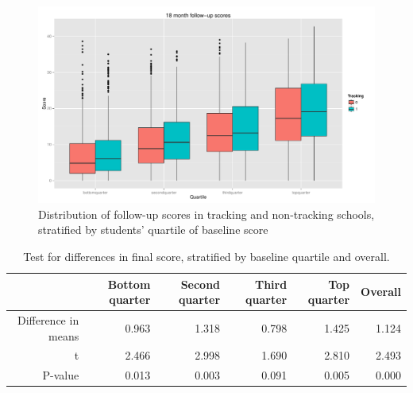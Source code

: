 \documentclass[11pt]{article}
\begin{document}
  \begin{figure}[H]
 \centering
 \includegraphics[scale=0.5]{tracking-stratif.pdf}
 \caption{Distribution of follow-up scores in tracking and non-tracking schools, stratified by students' quartile of baseline score}
 \label{fig:tracking-stratif}
 \end{figure} 
\begin{table}[ht]
\centering
\begin{tabular}{rrrrrr}
  \hline
 & Bottom quarter & Second quarter & Third quarter & Top quarter & Overall \\ 
  \hline
Difference in means & 0.963 & 1.318 & 0.798 & 1.425 & 1.124 \\ 
  t & 2.466 & 2.998 & 1.690 & 2.810 & 2.493 \\ 
  P-value & 0.013 & 0.003 & 0.091 & 0.005 & 0.000 \\ 
   \hline
\end{tabular}
\caption{Test for differences in final score, stratified by baseline quartile and overall.} \label{tab:tracking-stratif}
\end{table} %
\end{document}
